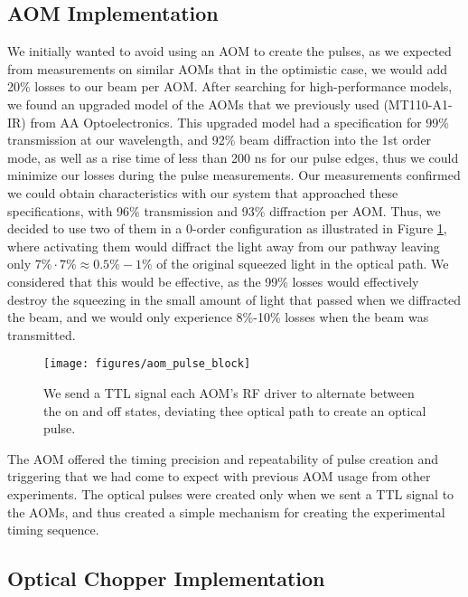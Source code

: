 \subsection{AOM Implementation} 
\label{aom_implementation} 

We initially wanted to avoid using an AOM to create the pulses, as we expected from measurements on similar AOMs that in the optimistic case, we would add 20\% losses to our beam per AOM.  After searching for high-performance models, we found an upgraded model of the AOMs that we previously used (MT110-A1-IR) from AA Optoelectronics.  This upgraded model had a specification for 99\% transmission at our wavelength, and 92\% beam diffraction into the 1st order mode, as well as a rise time of less than 200 ns for our pulse edges, thus we could minimize our losses during the pulse measurements.  Our measurements confirmed we could obtain characteristics with our system that approached these specifications, with 96\% transmission and 93\% diffraction per AOM.  Thus, we decided to use two of them in a 0-order configuration as illustrated in Figure \ref{fig:aom_pulse_block}, where activating them would diffract the light away from our pathway leaving only $7\% \cdot 7\%  \approx 0.5\%-1\%$ of the original squeezed light in the optical path.  We considered that this would be effective, as the 99\% losses would effectively destroy the squeezing in the small amount of light that passed when we diffracted the beam, and we would only experience 8\%-10\% losses when the beam was transmitted.

\begin{figure}[!ht] 
 \centering 
 \texttt{[image: figures/aom\_pulse\_block]} 
 \caption[Schematic for AOM optical pulse generation]{We send a TTL signal each AOM's RF driver to alternate between the on and off states, deviating thee optical path to create an optical pulse.} 
 \label{fig:aom_pulse_block} 
\end{figure}


The AOM offered the timing precision and repeatability of pulse creation and triggering that we had come to expect with previous AOM usage from other experiments.  The optical pulses were created only when we sent a TTL signal to the AOMs, and thus created a simple mechanism for creating the experimental timing sequence.





\subsection{Optical Chopper Implementation} 
\label{optical_chopper_implementation} 

